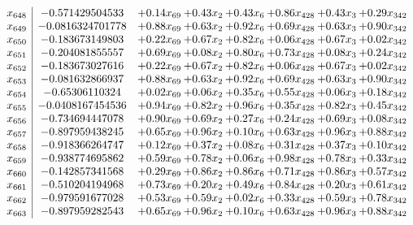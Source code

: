\documentclass[8pt]{article}
\begin{document}
\[\begin{array}{c| c c@{\hskip 2pt} c@{\hskip 2pt} c@{\hskip 2pt} c@{\hskip 2pt} c@{\hskip 2pt} c@{\hskip 2pt} }
 x_{648}   &  -0.571429504533 & +  0.14 x_{69} & +  0.43 x_{2} & +  0.43 x_{6} & +  0.86 x_{428} & +  0.43 x_{3} & +  0.29 x_{342}\\
 x_{649}   &  -0.0816324701778 & +  0.88 x_{69} & +  0.63 x_{2} & +  0.92 x_{6} & +  0.69 x_{428} & +  0.63 x_{3} & +  0.90 x_{342}\\
 x_{650}   &  -0.183673149803 & +  0.22 x_{69} & +  0.67 x_{2} & +  0.82 x_{6} & +  0.06 x_{428} & +  0.67 x_{3} & +  0.02 x_{342}\\
 x_{651}   &  -0.204081855557 & +  0.69 x_{69} & +  0.08 x_{2} & +  0.80 x_{6} & +  0.73 x_{428} & +  0.08 x_{3} & +  0.24 x_{342}\\
 x_{652}   &  -0.183673027616 & +  0.22 x_{69} & +  0.67 x_{2} & +  0.82 x_{6} & +  0.06 x_{428} & +  0.67 x_{3} & +  0.02 x_{342}\\
 x_{653}   &  -0.081632866937 & +  0.88 x_{69} & +  0.63 x_{2} & +  0.92 x_{6} & +  0.69 x_{428} & +  0.63 x_{3} & +  0.90 x_{342}\\
 x_{654}   &  -0.65306110324 & +  0.02 x_{69} & +  0.06 x_{2} & +  0.35 x_{6} & +  0.55 x_{428} & +  0.06 x_{3} & +  0.18 x_{342}\\
 x_{655}   &  -0.0408167454536 & +  0.94 x_{69} & +  0.82 x_{2} & +  0.96 x_{6} & +  0.35 x_{428} & +  0.82 x_{3} & +  0.45 x_{342}\\
 x_{656}   &  -0.734694447078 & +  0.90 x_{69} & +  0.69 x_{2} & +  0.27 x_{6} & +  0.24 x_{428} & +  0.69 x_{3} & +  0.08 x_{342}\\
 x_{657}   &  -0.897959438245 & +  0.65 x_{69} & +  0.96 x_{2} & +  0.10 x_{6} & +  0.63 x_{428} & +  0.96 x_{3} & +  0.88 x_{342}\\
 x_{658}   &  -0.918366264747 & +  0.12 x_{69} & +  0.37 x_{2} & +  0.08 x_{6} & +  0.31 x_{428} & +  0.37 x_{3} & +  0.10 x_{342}\\
 x_{659}   &  -0.938774695862 & +  0.59 x_{69} & +  0.78 x_{2} & +  0.06 x_{6} & +  0.98 x_{428} & +  0.78 x_{3} & +  0.33 x_{342}\\
 x_{660}   &  -0.142857341568 & +  0.29 x_{69} & +  0.86 x_{2} & +  0.86 x_{6} & +  0.71 x_{428} & +  0.86 x_{3} & +  0.57 x_{342}\\
 x_{661}   &  -0.510204194968 & +  0.73 x_{69} & +  0.20 x_{2} & +  0.49 x_{6} & +  0.84 x_{428} & +  0.20 x_{3} & +  0.61 x_{342}\\
 x_{662}   &  -0.979591677028 & +  0.53 x_{69} & +  0.59 x_{2} & +  0.02 x_{6} & +  0.33 x_{428} & +  0.59 x_{3} & +  0.78 x_{342}\\
 x_{663}   &  -0.897959282543 & +  0.65 x_{69} & +  0.96 x_{2} & +  0.10 x_{6} & +  0.63 x_{428} & +  0.96 x_{3} & +  0.88 x_{342}\\

\end{array}\]
\end{document}
